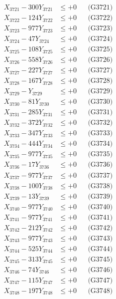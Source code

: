 \documentclass[a4paper,10pt]{article}
\begin{document}
{\begin{align}
\allowbreak
X_{3721} - 300Y_{3721} &\leq +0 && \text{(G3721)} \\
X_{3722} - 124Y_{3722} &\leq +0 && \text{(G3722)} \\
X_{3723} - 977Y_{3723} &\leq +0 && \text{(G3723)} \\
X_{3724} - 47Y_{3724} &\leq +0 && \text{(G3724)} \\
X_{3725} - 108Y_{3725} &\leq +0 && \text{(G3725)} \\
X_{3726} - 558Y_{3726} &\leq +0 && \text{(G3726)} \\
X_{3727} - 227Y_{3727} &\leq +0 && \text{(G3727)} \\
X_{3728} - 167Y_{3728} &\leq +0 && \text{(G3728)} \\
X_{3729} - Y_{3729} &\leq +0 && \text{(G3729)} \\
X_{3730} - 81Y_{3730} &\leq +0 && \text{(G3730)} \\
\allowbreak
X_{3731} - 285Y_{3731} &\leq +0 && \text{(G3731)} \\
X_{3732} - 372Y_{3732} &\leq +0 && \text{(G3732)} \\
X_{3733} - 347Y_{3733} &\leq +0 && \text{(G3733)} \\
X_{3734} - 444Y_{3734} &\leq +0 && \text{(G3734)} \\
X_{3735} - 977Y_{3735} &\leq +0 && \text{(G3735)} \\
X_{3736} - 17Y_{3736} &\leq +0 && \text{(G3736)} \\
X_{3737} - 977Y_{3737} &\leq +0 && \text{(G3737)} \\
X_{3738} - 100Y_{3738} &\leq +0 && \text{(G3738)} \\
X_{3739} - 13Y_{3739} &\leq +0 && \text{(G3739)} \\
X_{3740} - 977Y_{3740} &\leq +0 && \text{(G3740)} \\
\allowbreak
X_{3741} - 977Y_{3741} &\leq +0 && \text{(G3741)} \\
X_{3742} - 212Y_{3742} &\leq +0 && \text{(G3742)} \\
X_{3743} - 977Y_{3743} &\leq +0 && \text{(G3743)} \\
X_{3744} - 525Y_{3744} &\leq +0 && \text{(G3744)} \\
X_{3745} - 313Y_{3745} &\leq +0 && \text{(G3745)} \\
X_{3746} - 74Y_{3746} &\leq +0 && \text{(G3746)} \\
X_{3747} - 115Y_{3747} &\leq +0 && \text{(G3747)} \\
X_{3748} - 197Y_{3748} &\leq +0 && \text{(G3748)} \\

\end{align}}
\end{document}
